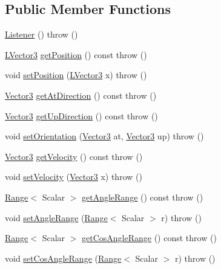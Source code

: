 \subsection*{Public Member Functions}
\begin{DoxyCompactItemize}
\item 
\hyperlink{classAudio_1_1Listener_a56b63285e0b3204991b956e505ebd23a}{Listener} ()  throw ()
\item 
\hyperlink{classAudio_1_1TVector3}{L\+Vector3} \hyperlink{classAudio_1_1Listener_abb791ce5606438ac120e97cb92e91380}{get\+Position} () const   throw ()
\item 
void \hyperlink{classAudio_1_1Listener_a74df3bb4c33cf9df4838f55608a4b24c}{set\+Position} (\hyperlink{classAudio_1_1TVector3}{L\+Vector3} x)  throw ()
\item 
\hyperlink{classAudio_1_1TVector3}{Vector3} \hyperlink{classAudio_1_1Listener_aab24702d7fddb1c225075c75fb49dff2}{get\+At\+Direction} () const   throw ()
\item 
\hyperlink{classAudio_1_1TVector3}{Vector3} \hyperlink{classAudio_1_1Listener_ac6fc56432c523d2a311c16fcc2bcbcad}{get\+Up\+Direction} () const   throw ()
\item 
void \hyperlink{classAudio_1_1Listener_a67556d14e2035e4627b2d0d6addb41e7}{set\+Orientation} (\hyperlink{classAudio_1_1TVector3}{Vector3} at, \hyperlink{classAudio_1_1TVector3}{Vector3} up)  throw ()
\item 
\hyperlink{classAudio_1_1TVector3}{Vector3} \hyperlink{classAudio_1_1Listener_aae6ef5039b3444ca418db198b6b1f290}{get\+Velocity} () const   throw ()
\item 
void \hyperlink{classAudio_1_1Listener_a3729356cacd581c643909e6f5f279860}{set\+Velocity} (\hyperlink{classAudio_1_1TVector3}{Vector3} x)  throw ()
\item 
\hyperlink{structAudio_1_1Range}{Range}$<$ Scalar $>$ \hyperlink{classAudio_1_1Listener_adcf4167277f42219b2ae59bb8f14ef52}{get\+Angle\+Range} () const   throw ()
\item 
void \hyperlink{classAudio_1_1Listener_a92d326feeb8a349d933fd5932cb57342}{set\+Angle\+Range} (\hyperlink{structAudio_1_1Range}{Range}$<$ Scalar $>$ r)  throw ()
\item 
\hyperlink{structAudio_1_1Range}{Range}$<$ Scalar $>$ \hyperlink{classAudio_1_1Listener_af819c59c53186afc0608bc71943bca6f}{get\+Cos\+Angle\+Range} () const   throw ()
\item 
void \hyperlink{classAudio_1_1Listener_a40cd01b70493dc2cfb6ac7ecfd22cef5}{set\+Cos\+Angle\+Range} (\hyperlink{structAudio_1_1Range}{Range}$<$ Scalar $>$ r)  throw ()

\end{DoxyCompactItemize}
